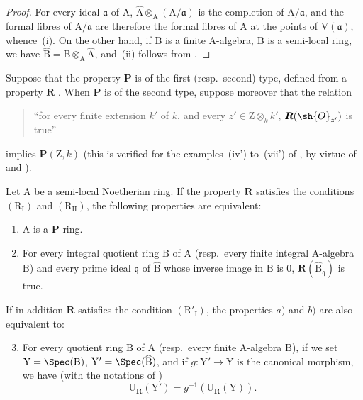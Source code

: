 \begin{proof}
For every ideal $\mathfrak{a}$ of $\mathrm{A}$, $\widehat{\mathrm{A}}\otimes_\mathrm{A}(\mathrm{A}/\mathfrak{a})$ is the completion of $\mathrm{A}/\mathfrak{a}$, and the formal fibres of $\mathrm{A}/\mathfrak{a}$ are therefore the formal fibres of $\mathrm{A}$ at the points of $\mathrm{V}(\mathfrak{a})$, whence~(i).
On the other hand, if $\mathrm{B}$ is a finite $\mathrm{A}$-algebra, $\mathrm{B}$ is a semi-local ring, we have $\widehat{\mathrm{B}}=\mathrm{B}\otimes_\mathrm{A}\widehat{\mathrm{A}}$, and~(ii) follows from .
\end{proof}

\begin{proposition}[7.3.16]
\label{IV.7.3.16}
Suppose that the property $\boldsymbol{P}$ is of the first (resp.~second) type, defined from a property $\boldsymbol{R}$ .
When $\boldsymbol{P}$ is of the second type, suppose moreover that the relation
\begin{quote}
``for every finite extension $k'$ of $k$, and every $z'\in\mathrm{Z}\otimes_k k'$, $\boldsymbol{R}(\sh{O}_{z'})$ is true''
\end{quote}
implies $\boldsymbol{P}(\mathrm{Z},k)$ (this is verified for the examples~(iv') to~(vii') of , by virtue of  and ).

Let $\mathrm{A}$ be a semi-local Noetherian ring.
If the property $\boldsymbol{R}$ satisfies the conditions $(\mathrm{R_I})$ and $(\mathrm{R_{II}})$, the following properties are equivalent:
\begin{enumerate}[label=\emph{\alph*)}]
  \item $\mathrm{A}$ is a $\boldsymbol{P}$-ring.
  \item For every integral quotient ring $\mathrm{B}$ of $\mathrm{A}$ (resp.~every finite integral A-algebra $\mathrm{B}$) and every prime ideal $\mathfrak{q}$ of $\widehat{\mathrm{B}}$ whose inverse image in $\mathrm{B}$ is $0$, $\boldsymbol{R}(\widehat{\mathrm{B}}_\mathfrak{q})$ is true.
\end{enumerate}
If in addition $\boldsymbol{R}$ satisfies the condition $(\mathrm{R}'_\mathrm{I})$, the properties $a)$ and $b)$ are also equivalent to:
\begin{enumerate}[label=\emph{\alph*)}]
  \setcounter{enumi}{2}
  \item For every quotient ring $\mathrm{B}$ of $\mathrm{A}$ (resp.~every finite A-algebra $\mathrm{B}$), if we set $\mathrm{Y}=\Spec(\mathrm{B})$, $\mathrm{Y}'=\Spec(\widehat{\mathrm{B}})$, and if $g:\mathrm{Y}'\to\mathrm{Y}$ is the canonical morphism, we have (with the notations of )
  \[
    \mathrm{U}_{\boldsymbol{R}}(\mathrm{Y}')=g^{-1}(\mathrm{U}_{\boldsymbol{R}}(\mathrm{Y})).
    \label{IV.7.3.16.1}
\tag{7.3.16.1}
  \]
\end{enumerate}
\end{proposition}

